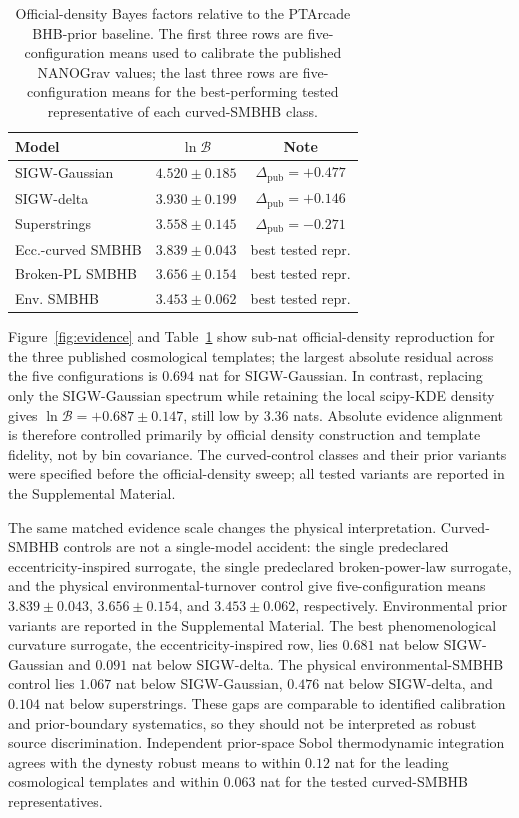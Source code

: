 \documentclass[aps,prl,reprint,superscriptaddress,nofootinbib,floatfix]{revtex4-2}
\begin{document}
\begin{table}[t]
\caption{\label{tab:lnb}
Official-density Bayes factors relative to the PTArcade BHB-prior
baseline.  The first three rows are five-configuration means used to
calibrate the published NANOGrav values; the last three rows are
five-configuration means for the best-performing tested representative
of each curved-SMBHB class.}
\begin{ruledtabular}
\begin{tabular}{@{}lcc@{}}
Model & $\ln\mathcal{B}$ & Note \\
\hline
SIGW-Gaussian & $4.520\pm0.185$ & $\Delta_\mathrm{pub}=+0.477$ \\
SIGW-delta & $3.930\pm0.199$ & $\Delta_\mathrm{pub}=+0.146$ \\
Superstrings & $3.558\pm0.145$ & $\Delta_\mathrm{pub}=-0.271$ \\
Ecc.-curved SMBHB & $3.839\pm0.043$ & best tested repr. \\
Broken-PL SMBHB & $3.656\pm0.154$ & best tested repr. \\
Env. SMBHB & $3.453\pm0.062$ & best tested repr. \\
\end{tabular}
\end{ruledtabular}
\end{table}

Figure~\ref{fig:evidence} and Table~\ref{tab:lnb} show sub-nat
official-density reproduction for the three published cosmological
templates; the largest absolute residual across the five configurations
is $0.694$ nat for SIGW-Gaussian.  In contrast, replacing only the
SIGW-Gaussian spectrum while retaining the local scipy-KDE density gives
$\ln\mathcal{B}=+0.687\pm0.147$, still low by $3.36$ nats.  Absolute
evidence alignment is therefore controlled primarily by official density
construction and template fidelity, not by bin covariance.
The curved-control classes and their prior variants were specified before
the official-density sweep; all tested variants are reported in the
Supplemental Material.

The same matched evidence scale changes the physical interpretation.
Curved-SMBHB controls are not a single-model accident: the single
predeclared eccentricity-inspired surrogate, the single predeclared
broken-power-law surrogate, and the physical environmental-turnover
control give five-configuration means $3.839\pm0.043$,
$3.656\pm0.154$, and $3.453\pm0.062$, respectively.  Environmental
prior variants are reported in the Supplemental Material.  The best
phenomenological curvature surrogate, the eccentricity-inspired row, lies
$0.681$ nat below SIGW-Gaussian and $0.091$ nat below SIGW-delta.  The
physical environmental-SMBHB control lies $1.067$ nat below
SIGW-Gaussian, $0.476$ nat below SIGW-delta, and $0.104$ nat below
superstrings.  These gaps are comparable to identified calibration and
prior-boundary systematics, so they should not be interpreted as robust
source discrimination.  Independent prior-space
Sobol thermodynamic integration agrees with the dynesty robust means to
within $0.12$ nat for the leading cosmological templates and within
$0.063$ nat for the tested curved-SMBHB representatives.
\end{document}
